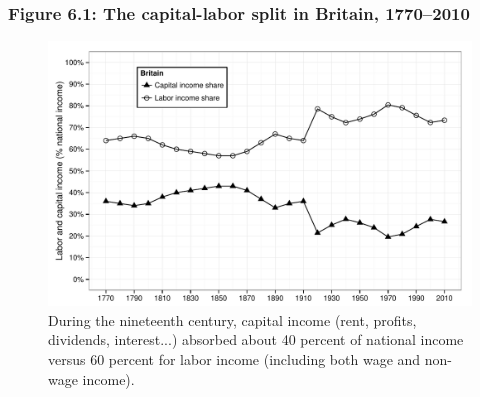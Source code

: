 \documentclass[t]{beamer}\usepackage[]{graphicx}\usepackage[]{color}
\newenvironment{knitrout}{}{} %
\begin{document}
\begin{frame}[label=Figure_6_1]
\frametitle{Figure 6.1: The capital-labor split in Britain, 1770--2010}
\begin{figure}[t]
\begin{minipage}[b]{\textwidth}
\centering
\begin{knitrout}\footnotesize
{}\color{fgcolor}

{\centering \includegraphics[width=1\linewidth]{figures/bw/Figure_6_1} 

}



\end{knitrout}
\caption{During the nineteenth century, capital income (rent, profits, dividends, interest...) absorbed about 40 percent of national income versus 60 percent for labor income (including both wage and non-wage income).}
\end{minipage}
\end{figure}
\end{frame}
\end{document}
